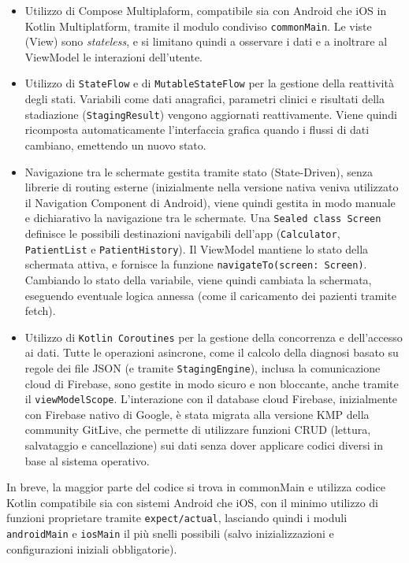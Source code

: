 \begin{itemize}
    \item Utilizzo di Compose Multiplaform, compatibile sia con Android che iOS in Kotlin Multiplatform, tramite
    il modulo condiviso \texttt{commonMain}.
    Le viste (View) sono \textit{stateless}, e si limitano quindi a osservare i dati e a inoltrare al ViewModel le interazioni dell'utente.
    \item Utilizzo di \texttt{StateFlow} e di \texttt{MutableStateFlow} per la gestione della reattività degli stati.
    Variabili come dati anagrafici, parametri clinici e risultati della stadiazione (\texttt{StagingResult}) vengono aggiornati reattivamente.
    Viene quindi ricomposta automaticamente l'interfaccia grafica quando i flussi di dati cambiano, emettendo un nuovo stato.
    \item Navigazione tra le schermate gestita tramite stato (State-Driven), senza librerie di routing esterne (inizialmente nella versione nativa veniva utilizzato il Navigation Component di Android), viene quindi gestita in modo manuale e dichiarativo la navigazione tra le schermate.
    Una \texttt{Sealed class Screen} definisce le possibili destinazioni navigabili dell'app (\texttt{Calculator}, \texttt{PatientList} e \texttt{PatientHistory}).
    Il ViewModel mantiene lo stato della schermata attiva, e fornisce la funzione \texttt{navigateTo(screen: Screen)}.
    Cambiando lo stato della variabile, viene quindi cambiata la schermata, eseguendo eventuale logica annessa (come il caricamento dei pazienti tramite fetch).
    \item Utilizzo di \texttt{Kotlin Coroutines} per la gestione della concorrenza e dell'accesso ai dati.
    Tutte le operazioni asincrone, come il calcolo della diagnosi basato su regole dei file JSON (e tramite \texttt{StagingEngine}), inclusa la comunicazione cloud di Firebase, sono gestite
    in modo sicuro e non bloccante, anche tramite il \texttt{viewModelScope}.
    L'interazione con il database cloud Firebase, inizialmente con Firebase nativo di Google, è stata migrata alla versione KMP della community GitLive, che permette di utilizzare funzioni CRUD
    (lettura, salvataggio e cancellazione) sui dati senza dover applicare codici diversi in base al sistema operativo.
\end{itemize}

In breve, la maggior parte del codice si trova in commonMain e utilizza codice Kotlin compatibile sia con sistemi Android che iOS, con il minimo utilizzo di funzioni proprietare tramite \texttt{expect/actual}, lasciando quindi
i moduli \texttt{androidMain} e \texttt{iosMain} il più snelli possibili (salvo inizializzazioni e configurazioni iniziali obbligatorie).

